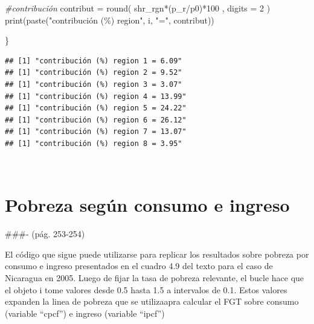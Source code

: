 \documentclass[
]{book}
\newenvironment{Shaded}{\begin{snugshade}}{\end{snugshade}}
\newcommand{\AttributeTok}[1]{\textcolor[rgb]{0.77,0.63,0.00}{#1}}
\newcommand{\CommentTok}[1]{\textcolor[rgb]{0.56,0.35,0.01}{\textit{#1}}}
\newcommand{\DecValTok}[1]{\textcolor[rgb]{0.00,0.00,0.81}{#1}}
\newcommand{\FunctionTok}[1]{\textcolor[rgb]{0.00,0.00,0.00}{#1}}
\newcommand{\NormalTok}[1]{#1}
\newcommand{\OtherTok}[1]{\textcolor[rgb]{0.56,0.35,0.01}{#1}}
\newcommand{\SpecialCharTok}[1]{\textcolor[rgb]{0.00,0.00,0.00}{#1}}
\newcommand{\StringTok}[1]{\textcolor[rgb]{0.31,0.60,0.02}{#1}}
\begin{document}
\begin{Shaded}
\begin{Highlighting}[]
  \CommentTok{\#contribución}
\NormalTok{  contribut }\OtherTok{=} \FunctionTok{round}\NormalTok{( shr\_rgn}\SpecialCharTok{*}\NormalTok{(p\_r}\SpecialCharTok{/}\NormalTok{p0)}\SpecialCharTok{*}\DecValTok{100}\NormalTok{ , }\AttributeTok{digits =} \DecValTok{2}\NormalTok{ ) }
  \FunctionTok{print}\NormalTok{(}\FunctionTok{paste}\NormalTok{(}\StringTok{"contribución (\%) region"}\NormalTok{, i, }\StringTok{"="}\NormalTok{, contribut))}
  
  
\NormalTok{\}}
\end{Highlighting}
\end{Shaded}

\begin{verbatim}
## [1] "contribución (%) region 1 = 6.09"
## [1] "contribución (%) region 2 = 9.52"
## [1] "contribución (%) region 3 = 3.07"
## [1] "contribución (%) region 4 = 13.99"
## [1] "contribución (%) region 5 = 24.22"
## [1] "contribución (%) region 6 = 26.12"
## [1] "contribución (%) region 7 = 13.07"
## [1] "contribución (%) region 8 = 3.95"
\end{verbatim}

~

\hypertarget{pobreza-seguxfan-consumo-e-ingreso}{%
\section{Pobreza según consumo e ingreso}\label{pobreza-seguxfan-consumo-e-ingreso}}

\#\#\#- (pág. 253-254)

El código que sigue puede utilizarse para replicar los resultados sobre pobreza por consumo e ingreso presentados en el cuadro 4.9 del texto para el caso de Nicaragua en 2005. Luego de fijar la tasa de pobreza relevante, el bucle hace que el objeto i tome valores desde 0.5 hasta 1.5 a intervalos de 0.1. Estos valores expanden la linea de pobreza que se utilizaapra calcular el FGT sobre consumo (variable ``cpcf'') e ingreso (variable ``ipcf'')
\end{document}
